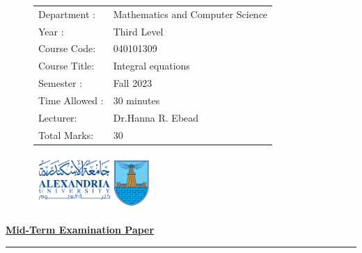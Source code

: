 \documentclass[]{article}
\begin{document}
\thispagestyle{empty}
\begin{figure}
    \begin{minipage}{0.7\textwidth}
            \begin{tabular}{l l}
                Department :& Mathematics and Computer Science \\
                Year : & Third Level \\
                Course Code: & 040101309                      \\
                Course Title:&  Integral equations            \\
                Semester :& Fall 2023                        \\
                Time Allowed :& 30 minutes                    \\
                Lecturer:& Dr.Hanna R. Ebead                  \\
                Total Marks:& 30                              \\
            \end{tabular}
    \end{minipage}%
    \begin{minipage}{0.3\textwidth}
        \includegraphics[width=4.5cm]{collagelogo.png}
    \end{minipage}
\end{figure}
\vspace*{-1cm}
\begin{center}
    \textbf{\underline{\LARGE Mid-Term Examination Paper}}
\end{center}
\vspace*{.2cm}

\hrule
\end{document}
